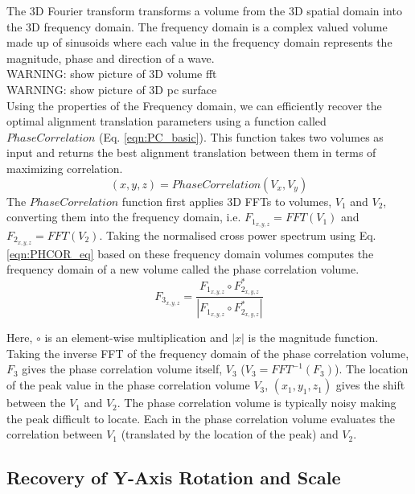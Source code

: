 The 3D Fourier transform transforms a volume from the 3D spatial domain into the 3D frequency domain. The frequency domain is a complex valued volume made up of sinusoids where each value in the frequency domain represents the magnitude, phase and direction of a wave.  \\


WARNING: show picture of 3D volume fft\\

WARNING: show picture of 3D pc surface\\

Using the properties of the Frequency domain, we can efficiently recover the optimal alignment translation parameters using a function called $PhaseCorrelation$ (Eq. \ref{eqn:PC_basic}). This function takes two volumes as input and returns the best alignment translation between them in terms of maximizing correlation.
\begin{equation} \label{eqn:PC_basic}
(x, y, z) = PhaseCorrelation(V_x, V_y)
\end{equation}
The $PhaseCorrelation$ function first applies 3D FFTs to volumes, $V_1$ and $V_2$, converting them into the frequency domain, i.e. $F_{1_{x,y,z}} = FFT(V_1)$ and $F_{2_{x,y,z}} = FFT(V_2)$. Taking the normalised cross power spectrum using Eq. \ref{eqn:PHCOR_eq} based on these frequency domain volumes computes the frequency domain of a new volume called the phase correlation volume. \\


\begin{equation} \label{eqn:PHCOR_eq}
F_{3_{x,y,z}} = \frac{F_{1_{x,y,z}} \circ F_{2_{x,y,z}}^*}{ | F_{1_{x,y,z}} \circ F_{2_{x,y,z}}^* | }
\end{equation}

Here, $\circ$ is an element-wise multiplication and $|x|$ is the magnitude function. Taking the inverse FFT of the frequency domain of the phase correlation volume, $F_3$ gives the phase correlation volume itself, $V_3$ ($V_3 = FFT^{-1}(F_3)$). The location of the peak value in the phase correlation volume $V_3$, $(x_1, y_1, z_1)$ gives the shift between the $V_1$ and $V_2$. The phase correlation volume is typically noisy making the peak difficult to locate. Each in the phase correlation volume evaluates the correlation between $V_1$ (translated by the location of the peak) and $V_2$.


\subsection{Recovery of Y-Axis Rotation and Scale}

